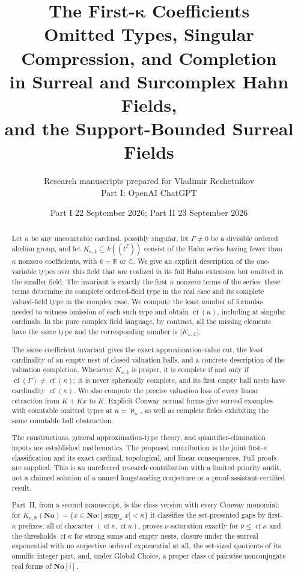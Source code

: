\documentclass[11pt,letterpaper]{article}
\title{\textbf{The First-$\boldsymbol\kappa$ Coefficients}\\[0.35em]
\Large Omitted Types, Singular Compression, and Completion\\in Surreal and Surcomplex Hahn Fields,\\and the Support-Bounded Surreal Fields}
\author{Research manuscripts prepared for Vladimir Reshetnikov\\\small Part I: OpenAI ChatGPT}
\date{Part I 22 September 2026; Part II 23 September 2026}
\numberwithin{equation}{section}
\theoremstyle{definition}
\theoremstyle{remark}
\newcommand{\R}{\mathbb R}
\newcommand{\C}{\mathbb C}
\newcommand{\No}{\mathbf{No}}
\newcommand{\cf}{\operatorname{cf}}
\newcommand{\suppw}{\operatorname{supp}_{\omega}}
\newcommand{\KN}[2]{K_{#1,#2}(\No)}%
\begin{document}
\maketitle
\thispagestyle{empty}
\begin{abstract}
Let $\kappa$ be any uncountable cardinal, possibly singular, let $\Gamma\ne0$ be a divisible ordered abelian group, and let
$K_{\kappa,k}\subseteq k((t^\Gamma))$ consist of the Hahn series having fewer than $\kappa$ nonzero coefficients, with $k=\R$ or $\C$.
We give an explicit description of the one-variable types over this field that are realized in its full Hahn extension but omitted in the smaller field. The invariant is exactly the first $\kappa$ nonzero terms of the series: these terms determine its complete ordered-field type in the real case and its complete valued-field type in the complex case. We compute the least number of formulas needed to witness omission of each such type and obtain $\cf(\kappa)$, including at singular cardinals. In the pure complex field language, by contrast, all the missing elements have the same type and the corresponding number is $|K_{\kappa,\C}|$.

The same coefficient invariant gives the exact approximation-value cut, the least cardinality of an empty nest of closed valuation balls, and a concrete description of the valuation completion. Whenever $K_{\kappa,k}$ is proper, it is complete if and only if $\cf(\Gamma)\ne\cf(\kappa)$; it is never spherically complete, and its first empty ball nests have cardinality $\cf(\kappa)$. We also compute the precise valuation loss of every linear retraction from $K+Kx$ to $K$. Explicit Conway normal forms give surreal examples with countable omitted types at $\kappa=\aleph_\omega$, as well as complete fields exhibiting the same countable ball obstruction.

The constructions, general approximation-type theory, and quantifier-elimination inputs are established mathematics. The proposed contribution is the joint first-$\kappa$ classification and its exact cardinal, topological, and linear consequences. Full proofs are supplied. This is an unrefereed research contribution with a limited priority audit, not a claimed solution of a named longstanding conjecture or a proof-assistant-certified result.

Part~II, from a second manuscript, is the class version with every Conway monomial: for $\KN\kappa\R=\{x\in\No:|\suppw x|<\kappa\}$ it classifies the set-presented gaps by first-$\kappa$ prefixes, all of character $(\cf\kappa,\cf\kappa)$, proves $\nu$-saturation exactly for $\nu\le\cf\kappa$ and the thresholds $\cf\kappa$ for strong sums and empty nests, closure under the surreal exponential with no surjective ordered exponential at all, the set-sized quotients of its omnific integer part, and, under Global Choice, a proper class of pairwise nonconjugate real forms of $\No[i]$.


\end{abstract}
\end{document}
